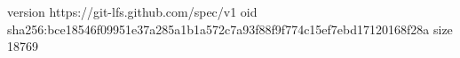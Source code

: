 version https://git-lfs.github.com/spec/v1
oid sha256:bce18546f09951e37a285a1b1a572c7a93f88f9f774c15ef7ebd17120168f28a
size 18769

